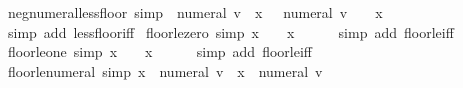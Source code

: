 \begin{isabellebody}
%
\endisadelimproof
\isanewline
{}\isamarkupfalse%
\ neg{\isacharunderscore}{\kern0pt}numeral{\isacharunderscore}{\kern0pt}less{\isacharunderscore}{\kern0pt}floor\ {\isacharbrackleft}{\kern0pt}simp{\isacharbrackright}{\kern0pt}{\isacharcolon}{\kern0pt}\ {\isachardoublequoteopen}{\isacharminus}{\kern0pt}\ numeral\ v\ {\isacharless}{\kern0pt}\ {\isasymlfloor}x{\isasymrfloor}\ {\isasymlongleftrightarrow}\ {\isacharminus}{\kern0pt}\ numeral\ v\ {\isacharplus}{\kern0pt}\ {}\ {\isasymle}\ x{\isachardoublequoteclose}\isanewline
%
\isadelimproof
\ \ %
\endisadelimproof
%
\isatagproof
{}\isamarkupfalse%
\ {\isacharparenleft}{\kern0pt}simp\ add{\isacharcolon}{\kern0pt}\ less{\isacharunderscore}{\kern0pt}floor{\isacharunderscore}{\kern0pt}iff{\isacharparenright}{\kern0pt}%
\endisatagproof
{\isafoldproof}%
%
\isadelimproof
\isanewline
%
\endisadelimproof
\isanewline
{}\isamarkupfalse%
\ floor{\isacharunderscore}{\kern0pt}le{\isacharunderscore}{\kern0pt}zero\ {\isacharbrackleft}{\kern0pt}simp{\isacharbrackright}{\kern0pt}{\isacharcolon}{\kern0pt}\ {\isachardoublequoteopen}{\isasymlfloor}x{\isasymrfloor}\ {\isasymle}\ {}\ {\isasymlongleftrightarrow}\ x\ {\isacharless}{\kern0pt}\ {}{\isachardoublequoteclose}\isanewline
%
\isadelimproof
\ \ %
\endisadelimproof
%
\isatagproof
{}\isamarkupfalse%
\ {\isacharparenleft}{\kern0pt}simp\ add{\isacharcolon}{\kern0pt}\ floor{\isacharunderscore}{\kern0pt}le{\isacharunderscore}{\kern0pt}iff{\isacharparenright}{\kern0pt}%
\endisatagproof
{\isafoldproof}%
%
\isadelimproof
\isanewline
%
\endisadelimproof
\isanewline
{}\isamarkupfalse%
\ floor{\isacharunderscore}{\kern0pt}le{\isacharunderscore}{\kern0pt}one\ {\isacharbrackleft}{\kern0pt}simp{\isacharbrackright}{\kern0pt}{\isacharcolon}{\kern0pt}\ {\isachardoublequoteopen}{\isasymlfloor}x{\isasymrfloor}\ {\isasymle}\ {}\ {\isasymlongleftrightarrow}\ x\ {\isacharless}{\kern0pt}\ {}{\isachardoublequoteclose}\isanewline
%
\isadelimproof
\ \ %
\endisadelimproof
%
\isatagproof
{}\isamarkupfalse%
\ {\isacharparenleft}{\kern0pt}simp\ add{\isacharcolon}{\kern0pt}\ floor{\isacharunderscore}{\kern0pt}le{\isacharunderscore}{\kern0pt}iff{\isacharparenright}{\kern0pt}%
\endisatagproof
{\isafoldproof}%
%
\isadelimproof
\isanewline
%
\endisadelimproof
\isanewline
{}\isamarkupfalse%
\ floor{\isacharunderscore}{\kern0pt}le{\isacharunderscore}{\kern0pt}numeral\ {\isacharbrackleft}{\kern0pt}simp{\isacharbrackright}{\kern0pt}{\isacharcolon}{\kern0pt}\ {\isachardoublequoteopen}{\isasymlfloor}x{\isasymrfloor}\ {\isasymle}\ numeral\ v\ {\isasymlongleftrightarrow}\ x\ {\isacharless}{\kern0pt}\ numeral\ v\ {\isacharplus}{\kern0pt}\ {}{\isachardoublequoteclose}\isanewline

\end{isabellebody}
